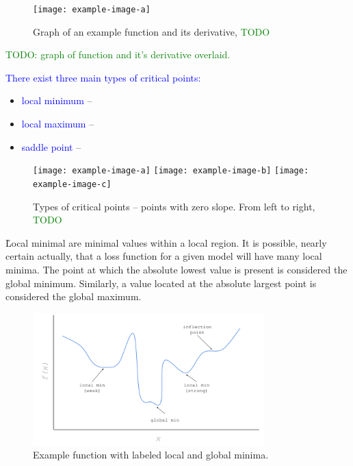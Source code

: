 \begin{figure}
	\centering
	\texttt{[image: example-image-a]}\hfil
	\caption{Graph of an example function and its derivative, \textcolor{green}{TODO}}
	\label{fig:calc_fn_deriv}
\end{figure}
\textcolor{green}{TODO: graph of function and it's derivative overlaid.}

\textcolor{blue}{There exist three main types of critical points:}

\begin{itemize}
	\item \textcolor{blue}{local minimum} -- 
	\item \textcolor{blue}{local maximum} -- 
	\item \textcolor{blue}{saddle point} -- 
\end{itemize}


\begin{figure}[htp]
	\centering
	\texttt{[image: example-image-a]}\hfil
	\texttt{[image: example-image-b]}\hfil
	\texttt{[image: example-image-c]}
\caption{Types of critical points -- points with zero slope. From left to right, \textcolor{green}{TODO}}
\label{fig:calc_critical_points}
\end{figure}



\r{Local minimal are minimal values within a local region. It is possible, nearly certain actually, that a loss function for a given model will have many local minima. The point at which the absolute lowest value is present is considered the {global minimum}. Similarly, a value located at the absolute largest point is considered the {global maximum}. }

\begin{figure}
	\centering
	\includegraphics[width=0.8\textwidth]{./misc/critical_points.png}\hfil
	\caption{Example function with labeled local and global minima.}
	\label{fig:calc_fn_deriv}
\end{figure}

